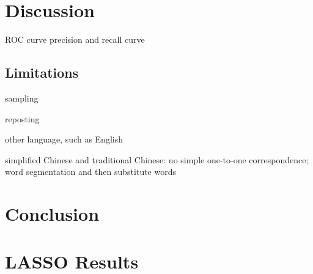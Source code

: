 \documentclass[11pt]{article}
\newcommand{\1}[1]{{\mathbf 1}\left\{#1\right\}}        %
\begin{document}
\section{Discussion}

ROC curve
precision and recall curve

\subsection{Limitations}

sampling \cite{boyd2004fastest} \cite{leskovec2006sampling}  \cite{wang2011understanding}

reposting

other language, such as English

simplified Chinese and traditional Chinese: no simple one-to-one correspondence; word segmentation and then substitute words



\section{Conclusion}



%


\newpage




\newpage
\appendix

\section{LASSO Results}
\end{document}
